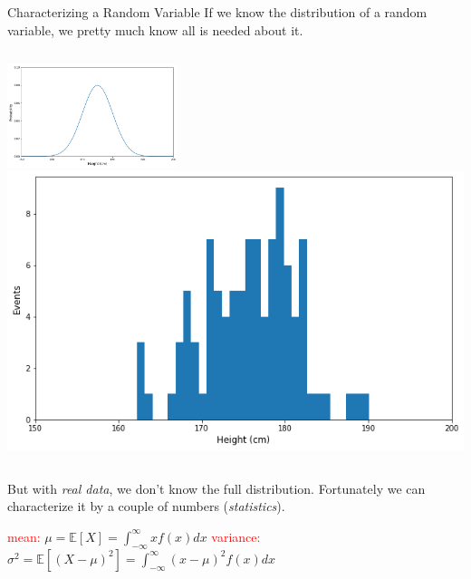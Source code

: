 \documentclass{beamer}
\begin{document}
\begin{frame}{Characterizing a Random Variable}
	If we know the distribution of a random variable, we pretty much know all is needed about it. 
	\newline
	\begin{columns}
		\includegraphics[height=3cm]{continouos_random_variable}
		\pause
		\includegraphics[height=3 cm]{real_data}
	\end{columns}
	\vspace{0.5cm}
	But with \textit{real data}, we don't know the full distribution. Fortunately we can characterize it by a couple of numbers (\emph{statistics}).
	\pause
	\small{
		\begin{center}
			\textcolor{red}{mean:} $\boxed{\mu = \mathbb{E}[X] = \int_{-\infty}^{\infty} xf(x)dx}$\quad
			\textcolor{red}{variance:}  
			$\boxed{\sigma^2 = \mathbb{E}[(X-\mu)^2] =\int_{-\infty}^{\infty} (x-\mu)^2f(x)dx}$
	\end{center}
}
\end{frame}
\end{document}
